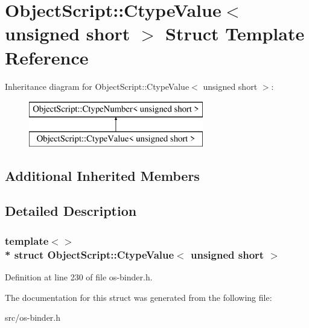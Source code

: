 \hypertarget{struct_object_script_1_1_ctype_value_3_01unsigned_01short_01_4}{}\section{Object\+Script\+:\+:Ctype\+Value$<$ unsigned short $>$ Struct Template Reference}
\label{struct_object_script_1_1_ctype_value_3_01unsigned_01short_01_4}
Inheritance diagram for Object\+Script\+:\+:Ctype\+Value$<$ unsigned short $>$\+:\begin{figure}[H]
\begin{center}
\leavevmode
\includegraphics[height=2.000000cm]{struct_object_script_1_1_ctype_value_3_01unsigned_01short_01_4}
\end{center}
\end{figure}
\subsection*{Additional Inherited Members}


\subsection{Detailed Description}
\subsubsection*{template$<$$>$\\*
struct Object\+Script\+::\+Ctype\+Value$<$ unsigned short $>$}



Definition at line 230 of file os-\/binder.\+h.



The documentation for this struct was generated from the following file\+:\begin{DoxyCompactItemize}
\item 
src/os-\/binder.\+h\end{DoxyCompactItemize}
